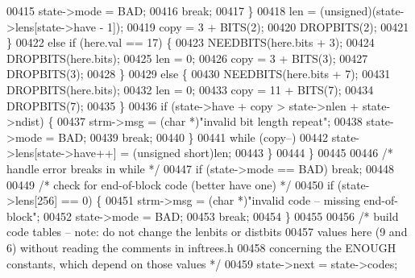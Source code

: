 \begin{DoxyCode}
{{{{00415                             state->mode = BAD;
00416                             \textcolor{keywordflow}{break};
00417                         \}
00418                         len = (unsigned)(state->lens[state->have - 1]);
00419                         copy = 3 + BITS(2);
00420                         DROPBITS(2);
00421                     \}
00422                     \textcolor{keywordflow}{else} \textcolor{keywordflow}{if} (here.val == 17) \{
00423                         NEEDBITS(here.bits + 3);
00424                         DROPBITS(here.bits);
00425                         len = 0;
00426                         copy = 3 + BITS(3);
00427                         DROPBITS(3);
00428                     \}
00429                     \textcolor{keywordflow}{else} \{
00430                         NEEDBITS(here.bits + 7);
00431                         DROPBITS(here.bits);
00432                         len = 0;
00433                         copy = 11 + BITS(7);
00434                         DROPBITS(7);
00435                     \}
00436                     \textcolor{keywordflow}{if} (state->have + copy > state->nlen + state->ndist) \{
00437                         strm->msg = (\textcolor{keywordtype}{char} *)\textcolor{stringliteral}{"invalid bit length repeat"};
00438                         state->mode = BAD;
00439                         \textcolor{keywordflow}{break};
00440                     \}
00441                     \textcolor{keywordflow}{while} (copy--)
00442                         state->lens[state->have++] = (\textcolor{keywordtype}{unsigned} short)len;
00443                 \}
00444             \}
00445 
00446             \textcolor{comment}{/* handle error breaks in while */}
00447             \textcolor{keywordflow}{if} (state->mode == BAD) \textcolor{keywordflow}{break};
00448 
00449             \textcolor{comment}{/* check for end-of-block code (better have one) */}
00450             \textcolor{keywordflow}{if} (state->lens[256] == 0) \{
00451                 strm->msg = (\textcolor{keywordtype}{char} *)\textcolor{stringliteral}{"invalid code -- missing end-of-block"};
00452                 state->mode = BAD;
00453                 \textcolor{keywordflow}{break};
00454             \}
00455 
00456             \textcolor{comment}{/* build code tables -- note: do not change the lenbits or distbits}
00457 \textcolor{comment}{               values here (9 and 6) without reading the comments in inftrees.h}
00458 \textcolor{comment}{               concerning the ENOUGH constants, which depend on those values */}
00459             state->next = state->codes;
}}}}
\end{DoxyCode}
